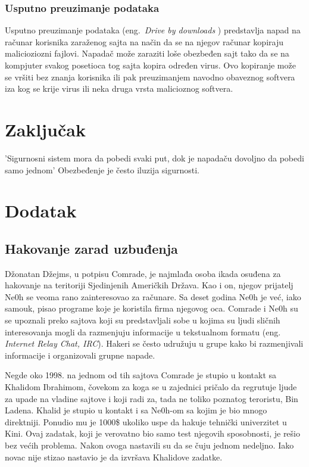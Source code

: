 \documentclass[a4paper]{article}
\begin{document}
\subsubsection{Usputno preuzimanje podataka }

Usputno preuzimanje podataka (eng.~{\em Drive by downloads }) predstavlja napad na računar korisnika zaraženog sajta na način da se 
na njegov računar kopiraju malicioziozni fajlovi. Napadač može zaraziti loše obezbeđen sajt tako da se na kompjuter svakog posetioca tog sajta kopira određen virus. Ovo kopiranje može se vršiti bez znanja korisnika ili pak preuzimanjem navodno obaveznog softvera iza kog se krije virus ili neka druga vrsta malicioznog softvera. \cite{drivebydownloads, ethics}



\section{Zaključak}
\label{sec:zakljucak}

'Sigurnosni sistem mora da pobedi svaki put, dok je napadaču dovoljno da pobedi samo jednom' \cite{intrusion}
Obezbeđenje je često iluzija sigurnosti. \cite{deception}

\appendix
 


\appendix
\section{Dodatak}

\subsection{Hakovanje zarad uzbuđenja}
\label{mladi_hakeri}

Džonatan Džejms, u potpisu Comrade, je najmlađa osoba ikada osuđena za hakovanje na teritoriji Sjedinjenih Američkih Država. Kao i on, njegov prijatelj Ne0h se veoma rano zainteresovao za računare. Sa deset godina Ne0h je već, iako samouk, pisao programe koje je koristila firma njegovog oca.  Comrade i Ne0h su se upoznali preko sajtova koji su predstavljali sobe u kojima su ljudi sličnih interesovanja mogli da razmenjuju informacije u tekstualnom formatu (eng. \textit{Internet Relay Chat, IRC}). Hakeri se često udružuju u grupe kako bi razmenjivali informacije i organizovali grupne napade.

Negde oko 1998. na jednom od tih sajtova Comrade je stupio u kontakt sa Khalidom Ibrahimom, čovekom za koga se u zajednici pričalo da regrutuje ljude za upade na vladine sajtove i koji radi za, tada ne toliko poznatog teroristu, Bin Ladena. Khalid je stupio u kontakt i sa Ne0h-om sa kojim je bio mnogo direktniji. Ponudio mu je 1000\$ ukoliko uspe da hakuje tehnički univerzitet u Kini. Ovaj zadatak, koji je verovatno bio samo test njegovih sposobnosti, je rešio bez većih problema. Nakon ovoga nastavili su da se čuju jednom nedeljno. Iako novac nije stizao nastavio je da izvršava Khalidove zadatke.
\end{document}
